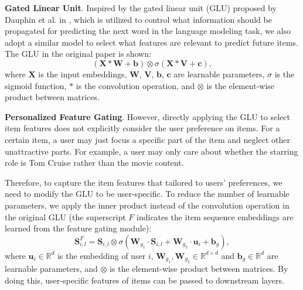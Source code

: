 \documentclass[sigconf]{acmart}
\begin{document}
\textbf{Gated Linear Unit}. Inspired by the gated linear unit (GLU) proposed by Dauphin et al. in \cite{DBLP:conf/icml/DauphinFAG17}, which is utilized to control what information should be propagated for predicting the next word in the language modeling task, we also adopt a similar model to select what features are relevant to predict future items. The GLU in the original paper is shown:
\[ (\mathbf{X} \ast \mathbf{W} + \mathbf{b}) \otimes \sigma(\mathbf{X} \ast \mathbf{V} + \mathbf{c}), \] 
where $ \mathbf{X} $ is the input embeddings, $ \mathbf{W} $, $ \mathbf{V} $, $ \mathbf{b} $, $ \mathbf{c} $ are learnable parameters, $ \sigma $ is the sigmoid function, $ \ast $ is the convolution operation, and $ \otimes $ is the element-wise product between matrices.

\textbf{Personalized Feature Gating}. However, directly applying the GLU to select item features does not explicitly consider the user preference on items. For a certain item, a user may just focus a specific part of the item and neglect other unattractive parts. For example, a user may only care about whether the starring role is Tom Cruise rather than the movie content. 

Therefore, to capture the item features that tailored to users' preferences, we need to modify the GLU to be user-specific. To reduce the number of learnable parameters, we apply the inner product instead of the convolution operation in the original GLU (the superscript $ F $ indicates the item sequence embeddings are learned from the feature gating module):
\begin{equation}
\mathbf{S}_{i,l}^{F} = \mathbf{S}_{i,l} \otimes \sigma(\mathbf{W}_{g_1} \cdot \mathbf{S}_{i,l} + \mathbf{W}_{g_2} \cdot \mathbf{u}_{i} + \mathbf{b}_{g}),
\end{equation}
where $ \mathbf{u}_{i} \in \mathbb{R}^{d} $ is the embedding of user $ i $, $ \mathbf{W}_{g_1}, \mathbf{W}_{g_2} \in \mathbb{R}^{d \times d} $ and $ \mathbf{b}_g \in \mathbb{R}^{d} $ are learnable parameters, and $ \otimes $ is the element-wise product between matrices. By doing this, user-specific features of items can be passed to downstream layers.
\end{document}
